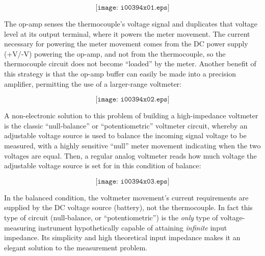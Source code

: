 $$\texttt{[image: i00394x01.eps]}$$

The op-amp senses the thermocouple's voltage signal and duplicates that voltage level at its output terminal, where it powers the meter movement.  The current necessary for powering the meter movement comes from the DC power supply (+V/-V) powering the op-amp, and not from the thermocouple, so the thermocouple circuit does not become ``loaded'' by the meter.  Another benefit of this strategy is that the op-amp buffer can easily be made into a precision amplifier, permitting the use of a larger-range voltmeter:

$$\texttt{[image: i00394x02.eps]}$$

A non-electronic solution to this problem of building a high-impedance voltmeter is the classic ``null-balance'' or ``potentiometric'' voltmeter circuit, whereby an adjustable voltage source is used to balance the incoming signal voltage to be measured, with a highly sensitive ``null'' meter movement indicating when the two voltages are equal.  Then, a regular analog voltmeter reads how much voltage the adjustable voltage source is set for in this condition of balance:

$$\texttt{[image: i00394x03.eps]}$$

In the balanced condition, the voltmeter movement's current requirements are supplied by the DC voltage source (battery), not the thermocouple.  In fact this type of circuit (null-balance, or ``potentiometric'') is the {\it only} type of voltage-measuring instrument hypothetically capable of attaining {\it infinite} input impedance.  Its simplicity and high theoretical input impedance makes it an elegant solution to the measurement problem.











